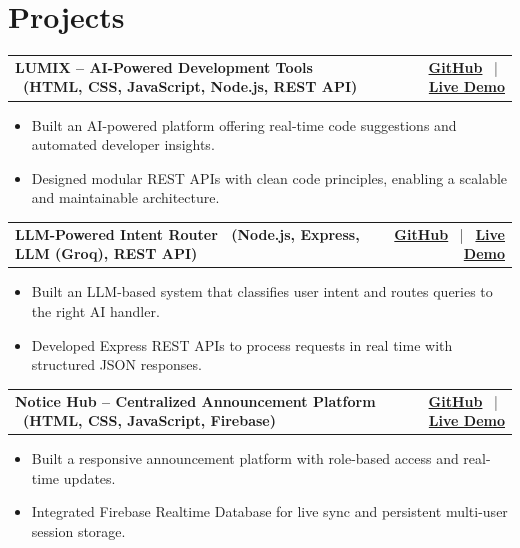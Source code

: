 \documentclass[9.5pt, letterpaper]{article}
\begin{document}
\vspace{2pt}

\section{Projects}

\noindent
\begin{tabularx}{\linewidth}{@{}X r@{}}
  \textbf{LUMIX -- AI-Powered Development Tools ~(HTML, CSS, JavaScript, Node.js, REST API)} &
  \textbf{\href{https://github.com/DuvvuLakshmiPrasanna/AI_World}{GitHub}} ~|~ \textbf{\href{https://lumixproject.onrender.com}{Live Demo}}
\end{tabularx}\vspace{-2pt}
\begin{itemize}
  \item Built an AI-powered platform offering real-time code suggestions and automated developer insights.
  \item Designed modular REST APIs with clean code principles, enabling a scalable and maintainable architecture.
\end{itemize}

\vspace{3pt}
\noindent
\begin{tabularx}{\linewidth}{@{}X r@{}}
  \textbf{LLM-Powered Intent Router ~(Node.js, Express, LLM (Groq), REST API)} &
  \textbf{\href{https://github.com/DuvvuLakshmiPrasanna/LLM-powered-intent-router}{GitHub}} ~|~ \textbf{\href{https://llm-powered-intent-router.onrender.com/}{Live Demo}}
\end{tabularx}\vspace{-2pt}
\begin{itemize}
  \item Built an LLM-based system that classifies user intent and routes queries to the right AI handler.
  \item Developed Express REST APIs to process requests in real time with structured JSON responses.
\end{itemize}

\vspace{3pt}
\noindent
\begin{tabularx}{\linewidth}{@{}X r@{}}
  \textbf{Notice Hub -- Centralized Announcement Platform ~(HTML, CSS, JavaScript, Firebase)} &
  \textbf{\href{https://github.com/DuvvuLakshmiPrasanna/Notice_Hub}{GitHub}} ~|~ \textbf{\href{https://duvvulakshmiprasanna.github.io/Notice_Hub/}{Live Demo}}
\end{tabularx}\vspace{-2pt}
\begin{itemize}
  \item Built a responsive announcement platform with role-based access and real-time updates.
  \item Integrated Firebase Realtime Database for live sync and persistent multi-user session storage.
\end{itemize}
\end{document}
